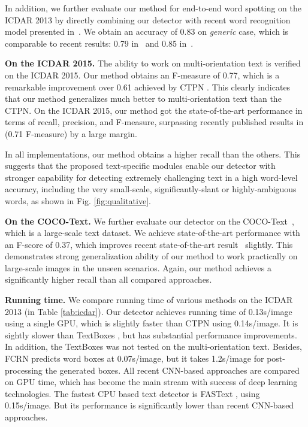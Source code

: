 \documentclass[10pt,twocolumn,letterpaper]{article}
\begin{document}
In addition, we further evaluate our method for end-to-end word spotting on the ICDAR 2013 by directly combining our detector with recent word recognition model presented in~\cite{Pan2016_reading}. We obtain an accuracy of 0.83 on \textit{generic} case, which is comparable to recent results: 0.79 in~\cite{Jaderberg2015} and 0.85 in~\cite{Gupta2016}.

\textbf{On the ICDAR 2015.} The ability to work on multi-orientation text is verified on the ICDAR 2015. Our method obtains an F-measure of 0.77, which is a remarkable improvement over 0.61 achieved by CTPN \cite{Tian2016}. This clearly indicates that our method generalizes much better to multi-orientation text than the CTPN.  On the ICDAR 2015, our method got the state-of-the-art performance in terms of recall, precision, and F-measure, surpassing recently published results in \cite{Liu2017} (0.71 F-measure) by a large margin.

In all implementations, our method obtains a higher recall than the others. This suggests that the proposed text-specific modules enable our detector with stronger capability for detecting extremely challenging text in a high word-level accuracy, including the very small-scale, significantly-slant or highly-ambiguous words, as shown in Fig. \ref{fig:qualitative}.

\textbf{On the COCO-Text.} We further evaluate our detector on the COCO-Text~\cite{veit2016cocotext}, which is a large-scale text dataset. We achieve state-of-the-art performance with an F-score of 0.37, which improves recent state-of-the-art result~\cite{Yao2016} slightly. This demonstrates strong generalization ability of our method to work practically on large-scale images in the unseen scenarios.  Again, our method achieves a significantly higher recall than all compared approaches.

\textbf{Running time.} We compare running time of various methods on the ICDAR 2013 (in Table \ref{tab:icdar}). Our detector achieves running time of 0.13s/image using a single GPU, which is slightly faster than CTPN using 0.14s/image. It is sightly slower than TextBoxes \cite{Liao2017}, but has substantial performance improvements. In addition, the TextBoxes was not tested on the multi-orientation text. Besides, FCRN \cite{Gupta2016} predicts word boxes at 0.07s/image, but it takes 1.2s/image for post-processing the generated boxes. All recent CNN-based approaches are compared on GPU time, which has become the main stream with success of deep learning technologies.  The fastest CPU based text detector is FASText \cite{Busta2015}, using 0.15s/image. But its performance is significantly lower than recent CNN-based approaches.
\end{document}
